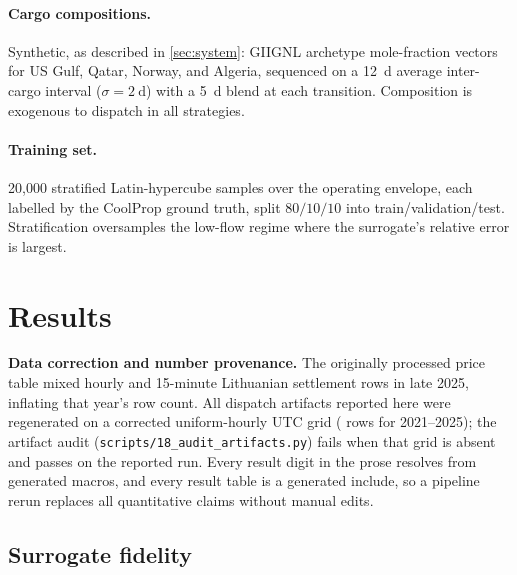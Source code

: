 \documentclass[11pt]{article}
\begin{document}
\paragraph{Cargo compositions.} Synthetic, as described in
\cref{sec:system}: GIIGNL archetype mole-fraction vectors \citep{giignl2023}
for US Gulf, Qatar, Norway, and Algeria, sequenced on a \SI{12}{\day} average
inter-cargo interval ($\sigma=\SI{2}{\day}$) with a \SI{5}{\day} blend at each
transition. Composition is exogenous to dispatch in all strategies.

\paragraph{Training set.} 20{,}000 stratified Latin-hypercube samples over
the operating envelope, each labelled by the CoolProp ground truth, split
$80/10/10$ into train/validation/test. Stratification oversamples the
low-flow regime where the surrogate's relative error is largest.

\section{Results}
\label{sec:results}

\noindent\textbf{Data correction and number provenance.} The originally
processed price table mixed hourly and 15-minute Lithuanian settlement rows in
late 2025, inflating that year's row count. All dispatch artifacts reported
here were regenerated on a corrected uniform-hourly UTC grid
(\lngRecordCountMarketHours{} rows for 2021--2025); the artifact audit
(\texttt{scripts/18\_audit\_artifacts.py}) fails when that grid is absent and
passes on the reported run. Every result digit in the prose resolves from
generated macros, and every result table is a generated include, so a pipeline
rerun replaces all quantitative claims without manual edits.

\subsection{Surrogate fidelity}
\label{sec:fidelity}

\end{document}
